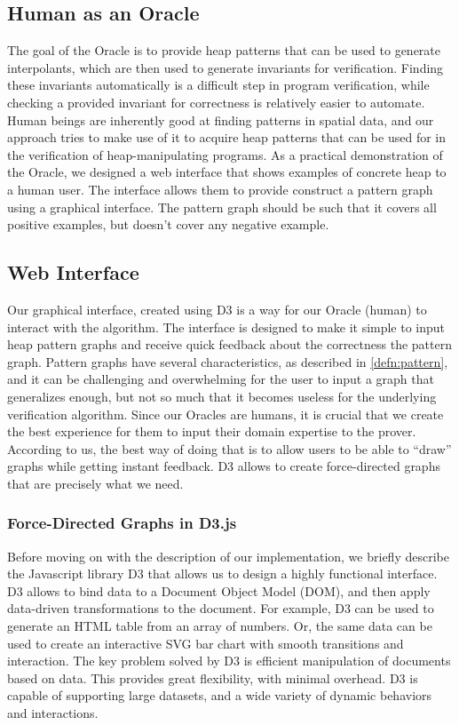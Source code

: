 \subsection{Human as an Oracle}
The goal of the Oracle is to provide heap patterns that can be used to generate interpolants, which are then used to generate invariants for verification. Finding these invariants automatically is a difficult step in program verification, while checking a provided invariant for correctness is relatively easier to automate. Human beings are inherently good at finding patterns in spatial data, and our approach tries to make use of it to acquire heap patterns that can be used for in the verification of heap-manipulating programs. As a practical demonstration of the Oracle, we designed a web interface that shows examples of concrete heap to a human user. The interface allows them to provide construct a pattern graph using a graphical interface. The pattern graph should be such that it covers all positive examples, but doesn't cover any negative example.

\subsection{Web Interface}
\label{sec:web-interface}
Our graphical interface, created using D3 \cite{d3js} is a way for our Oracle (human) to interact with the \verifier algorithm. The interface is designed to make it simple to input heap pattern graphs and receive quick feedback about the correctness the pattern graph. Pattern graphs have several characteristics, as described in \autoref{defn:pattern}, and it can be challenging and overwhelming for the user to input a graph that generalizes enough, but not so much that it becomes useless for the underlying verification algorithm. Since our Oracles are humans, it is crucial that we create the best experience for them to input their domain expertise to the prover. According to us, the best way of doing that is to allow users to be able to ``draw'' graphs while getting instant feedback. D3 allows to create force-directed graphs that are precisely what we need.

\subsubsection{Force-Directed Graphs in D3.js}
Before moving on with the description of our implementation, we briefly describe the Javascript library D3 that allows us to design a highly functional interface. D3 allows to bind data to a Document Object Model (DOM), and then apply data-driven transformations to the document. For example, D3 can be used to generate an HTML table from an array of numbers. Or, the same data can be used to create an interactive SVG bar chart with smooth transitions and interaction. The key problem solved by D3 is efficient manipulation of documents based on data. This provides great flexibility, with minimal overhead. D3 is capable of supporting large datasets, and a wide variety of dynamic behaviors and interactions.

